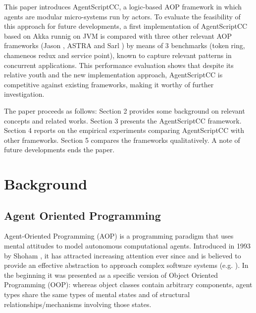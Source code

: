 This paper introduces AgentScriptCC, a logic-based AOP framework in which agents are modular micro-systems run by actors. To evaluate the feasibility of this approach for future developments, a first implementation of AgentScriptCC based on Akka runnig on JVM is compared with three other relevant AOP frameworks (Jason \cite{Bordini2005}, ASTRA \cite{Astra} and Sarl \cite{Astra}) by means of 3 benchmarks (token ring, chameneos redux and service point), known to capture relevant patterns in concurrent applications. This performance evaluation shows that despite its relative youth and the new implementation approach, AgentScriptCC is competitive against existing frameworks, making it worthy of further investigation.

The paper proceeds as follows: Section 2 provides some background on relevant concepts and related works. Section 3 presents the AgentScriptCC framework. Section 4 reports on the empirical experiments comparing AgentScriptCC with other frameworks. Section 5 compares the frameworks qualitatively. A note of future developments ends the paper.


\section{Background}
\subsection{Agent Oriented Programming}

Agent-Oriented Programming (AOP) is a programming paradigm that uses mental attitudes to model autonomous computational agents. Introduced in 1993 by Shoham \cite{shoham1993agent}, it has attracted increasing attention ever since and is believed to provide an effective abstraction to approach complex software systems (e.g. \cite{Sarl}). In the beginning it was presented as a specific version of Object Oriented Programming (OOP): whereas object classes contain arbitrary components, agent types share the same types of mental states and of structural relationships/mechanisms involving those states. 

\vspace{-5pt}
